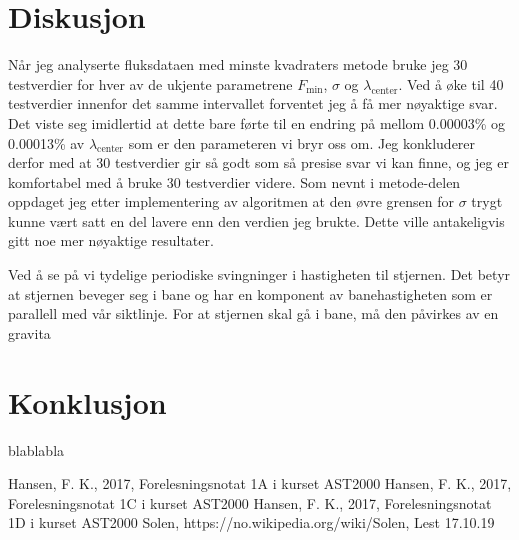 \documentclass[reprint, english,notitlepage]{revtex4-1}  %
\begin{document}
\section{Diskusjon}

Når jeg analyserte fluksdataen med minste kvadraters metode bruke jeg 30 testverdier for hver av
 de ukjente parametrene $F_{\text{min}}$, $\sigma$ og $\lambda_{\text{center}}$. Ved å øke til 40 testverdier
 innenfor det samme intervallet forventet jeg å få mer nøyaktige svar. Det viste seg imidlertid
 at dette bare førte til en endring på mellom 0.00003\% og 0.00013\% av $\lambda_{\text{center}}$ som er
 den parameteren vi bryr oss om. Jeg konkluderer derfor med at 30 testverdier gir så godt som så
 presise svar vi kan finne, og jeg er komfortabel med å bruke 30 testverdier videre. Som nevnt i
 metode-delen oppdaget jeg etter implementering av algoritmen at den øvre grensen for $\sigma$
 trygt kunne vært satt en del lavere enn den verdien jeg brukte. Dette ville antakeligvis gitt
 noe mer nøyaktige resultater.

Ved å se på  vi tydelige periodiske svingninger i hastigheten til
 stjernen. Det betyr at stjernen beveger seg i bane og har en komponent av banehastigheten som er
 parallell med vår siktlinje. For at stjernen skal gå i bane, må den påvirkes av en
 gravita


\section{Konklusjon}
blablabla



\onecolumngrid
\vspace{1cm} %


\begin{thebibliography}{}
 Hansen, F. K.,  2017, Forelesningsnotat 1A i kurset AST2000
 Hansen, F. K.,  2017, Forelesningsnotat 1C i kurset AST2000
 Hansen, F. K.,  2017, Forelesningsnotat 1D i kurset AST2000
 Solen, https://no.wikipedia.org/wiki/Solen, Lest 17.10.19

\end{thebibliography}
\end{document}
